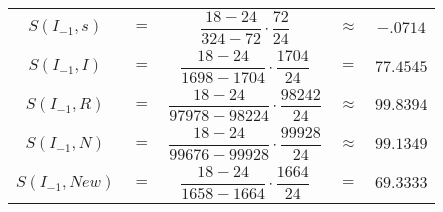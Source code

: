 \documentclass[12pt]{report}
\begin{document}
\begin{itemize}
    \begin{center}
    \begin{tabular}{|ccccc|}
         \hline
         $S(I_{-1},s)$& $=$&$\dfrac{18-24}{324-72}\cdot \dfrac{72}{24}$ &$\approx$&$-.0714$\\
         $S(I_{-1},I)$& $=$&$\dfrac{18-24}{1698-1704}\cdot \dfrac{1704}{24}$ &$=$&$77.4545$\\
         $S(I_{-1},R)$& $=$&$\dfrac{18-24}{97978-98224}\cdot \dfrac{98242}{24}$ &$\approx$&$99.8394$\\
         $S(I_{-1},N)$& $=$&$\dfrac{18-24}{99676-99928}\cdot \dfrac{99928}{24}$ &$\approx$&$99.1349$\\
         $S(I_{-1},New)$& $=$&$\dfrac{18-24}{1658-1664}\cdot \dfrac{1664}{24}$ &$=$&$69.3333$\\
         \hline
    \end{tabular}
    \end{center}
\end{itemize}
\end{document}
